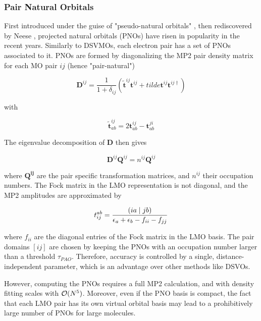 \subsubsection*{Pair Natural Orbitals}
First introduced under the guise of "pseudo-natural orbitals" \cite{Edm1965}, then rediscovered by Neese \cite{Nee2009a,Nee2009b,Han2011}, projected natural orbitals (PNOs) have risen in popularity in the recent years. Similarly to DSVMOs, each electron pair has a set of PNOs associated to it. PNOs are formed by diagonalizing the MP2 pair density matrix for each MO pair $ij$ (hence "pair-natural")

\begin{equation}
\mathbf{D}^{ij} = \frac{1}{1+\delta_{ij}} \left(\tilde{\mathbf{t}}^{ij} \mathbf{t}^{ij} + tilde{\mathbf{t}}^{ij} \mathbf{t}^{ij\dagger} \right)
\end{equation}

\noindent with 

\begin{equation}
\mathbf{\tilde{t}}^{ij}_{ab} = 2 \mathbf{t}^{ij}_{ab} - \mathbf{t}^{ji}_{ab} 
\end{equation}

\noindent The eigenvalue decomposition of $\mathbf{D}$ then gives

\begin{equation}
\mathbf{D}^{ij} \mathbf{Q}^{ij} = n^{ij} \mathbf{Q}^{ij} 
\end{equation}

\noindent where $\mathbf{Q^{ij}}$ are the pair specific transformation matrices, and $n^{ij}$ their occupation numbers. The Fock matrix in the LMO representation is not diagonal, and the MP2 amplitudes are approximated by

\begin{equation}
t_{ij}^{ab} = \frac{\left( ia \mid jb \right)}{\epsilon_a + \epsilon_b - f_{ii} - f_{jj}}
\end{equation}

\noindent where $f_{ii}$ are the diagonal entries of the Fock matrix in the LMO basis. The pair domains $[ij]$ are chosen by keeping the PNOs with an occupation number larger than a threshold $\tau_{PAO}$. Therefore, accuracy is controlled by a single, distance-independent parameter, which is an advantage over other methods like DSVOs. 

However, computing the PNOs requires a full MP2 calculation, and with density fitting scales with $\mathcal{O}(N^{5})$. Moreover, even if the PNO basis is compact, the fact that each LMO pair has its own virtual orbital basis may lead to a prohibitively large number of PNOs for large molecules.

